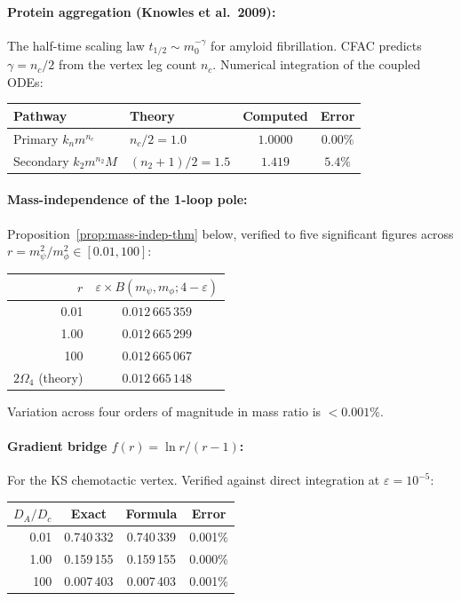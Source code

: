 \documentclass[10pt,a4paper,twocolumn]{article}
\theoremstyle{definition}
\begin{document}
\paragraph{Protein aggregation (Knowles et al.\ 2009):}
The half-time scaling law $t_{1/2} \sim m_0^{-\gamma}$ for
amyloid fibrillation.  CFAC predicts $\gamma = n_c/2$ from the
vertex leg count $n_c$.  Numerical integration of the coupled
ODEs:
\begin{center}
\small
\begin{tabular}{@{}llcc@{}}
\toprule
Pathway & Theory & Computed & Error \\
\midrule
Primary $k_n m^{n_c}$   & $n_c/2 = 1.0$ & $1.0000$ & $\mathbf{0.00\%}$ \\
Secondary $k_2 m^{n_2} M$ & $(n_2{+}1)/2 = 1.5$ & $1.419$ & $5.4\%$ \\
\bottomrule
\end{tabular}
\end{center}

\paragraph{Mass-independence of the 1-loop pole:}
Proposition~\ref{prop:mass-indep-thm} below, verified to five
significant figures across $r = m_\psi^2/m_\phi^2 \in [0.01,
100]$:
\begin{center}
\small
\begin{tabular}{@{}rc@{}}
\toprule
$r$ & $\varepsilon \times B(m_\psi, m_\phi; 4-\varepsilon)$ \\
\midrule
0.01 & $0.012\,665\,359$ \\
1.00 & $0.012\,665\,299$ \\
100  & $0.012\,665\,067$ \\
\midrule
$2\Omega_4$ (theory) & $0.012\,665\,148$ \\
\bottomrule
\end{tabular}
\end{center}
Variation across four orders of magnitude in mass ratio is
$< 0.001\%$.

\paragraph{Gradient bridge $f(r) = \ln r/(r-1)$:}
For the KS chemotactic vertex.  Verified against direct
integration at $\varepsilon = 10^{-5}$:
\begin{center}
\small
\begin{tabular}{@{}rccc@{}}
\toprule
$D_A/D_c$ & Exact & Formula & Error \\
\midrule
0.01 & 0.740\,332 & 0.740\,339 & 0.001\% \\
1.00 & 0.159\,155 & 0.159\,155 & 0.000\% \\
100  & 0.007\,403 & 0.007\,403 & 0.001\% \\
\bottomrule
\end{tabular}
\end{center}
\end{document}
